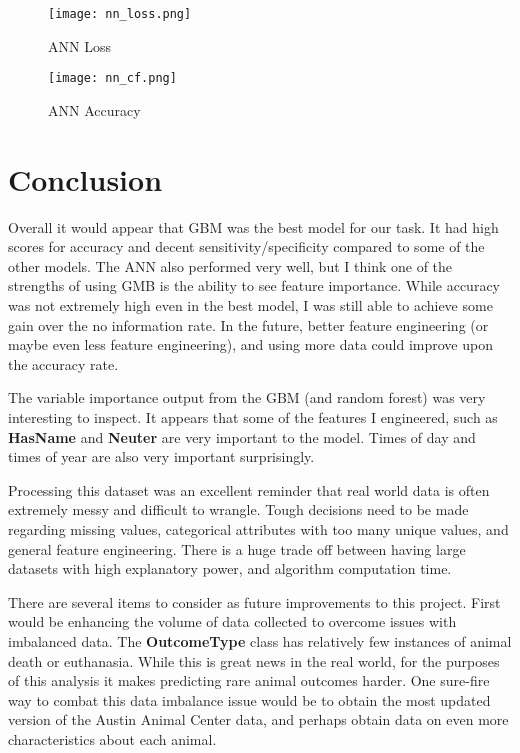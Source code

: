 \documentclass[12pt]{article} %
\begin{document}
\begin{itemize}
\begin{figure}[h!]
  \centering
  \texttt{[image: nn\_loss.png]}                  
  \caption{ANN Loss}
  \label{fig:GBM Model}
\end{figure}

\begin{figure}[h!]
  \centering
  \texttt{[image: nn\_cf.png]}                  
  \caption{ANN Accuracy}
  \label{fig:GBM Model}
\end{figure}

\end{itemize}

\newpage
\vspace*{1 cm}

\section{Conclusion} 
Overall it would appear that GBM was the best model for our task. It had high scores for accuracy and decent sensitivity/specificity compared to some of the other models. The ANN also performed very well, but I think one of the strengths of using GMB is the ability to see feature importance. While accuracy was not extremely high even in the best model, I was still able to achieve some gain over the no information rate. In the future, better feature engineering (or maybe even less feature engineering), and using more data could improve upon the accuracy rate.

The variable importance output from the GBM (and random forest) was very interesting to inspect. It appears that some of the features I engineered, such as \textbf{HasName} and \textbf{Neuter} are very important to the model. Times of day and times of year are also very important surprisingly. 

Processing this dataset was an excellent reminder that real world data is often extremely messy and difficult to wrangle. Tough decisions need to be made regarding missing values, categorical attributes with too many unique values, and general feature engineering. There is a huge trade off between having large datasets with high explanatory power, and algorithm computation time. 

There are several items to consider as future improvements to this project. First would be enhancing the volume of data collected to overcome issues with imbalanced data. The \textbf{OutcomeType} class has relatively few instances of animal death or euthanasia. While this is great news in the real world, for the purposes of this analysis it makes predicting rare animal outcomes harder.  One sure-fire way to combat this data imbalance issue would be to obtain the most updated version of the Austin Animal Center data, and perhaps obtain data on even more characteristics about each animal. 
\end{document}
